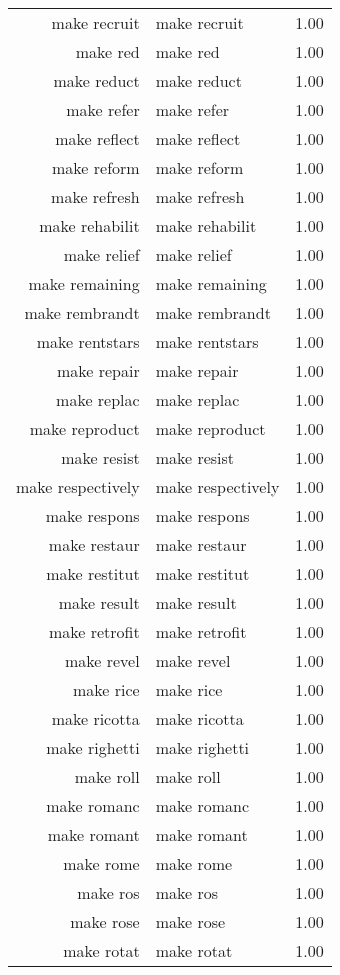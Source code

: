 \begin{table}[ht]
\begin{tabular}{rlr}
  make recruit & make recruit & 1.00 \\ 
  make red & make red & 1.00 \\ 
  make reduct & make reduct & 1.00 \\ 
  make refer & make refer & 1.00 \\ 
  make reflect & make reflect & 1.00 \\ 
  make reform & make reform & 1.00 \\ 
  make refresh & make refresh & 1.00 \\ 
  make rehabilit & make rehabilit & 1.00 \\ 
  make relief & make relief & 1.00 \\ 
  make remaining & make remaining & 1.00 \\ 
  make rembrandt & make rembrandt & 1.00 \\ 
  make rentstars & make rentstars & 1.00 \\ 
  make repair & make repair & 1.00 \\ 
  make replac & make replac & 1.00 \\ 
  make reproduct & make reproduct & 1.00 \\ 
  make resist & make resist & 1.00 \\ 
  make respectively & make respectively & 1.00 \\ 
  make respons & make respons & 1.00 \\ 
  make restaur & make restaur & 1.00 \\ 
  make restitut & make restitut & 1.00 \\ 
  make result & make result & 1.00 \\ 
  make retrofit & make retrofit & 1.00 \\ 
  make revel & make revel & 1.00 \\ 
  make rice & make rice & 1.00 \\ 
  make ricotta & make ricotta & 1.00 \\ 
  make righetti & make righetti & 1.00 \\ 
  make roll & make roll & 1.00 \\ 
  make romanc & make romanc & 1.00 \\ 
  make romant & make romant & 1.00 \\ 
  make rome & make rome & 1.00 \\ 
  make ros & make ros & 1.00 \\ 
  make rose & make rose & 1.00 \\ 
  make rotat & make rotat & 1.00 \\ 

\end{tabular}
\end{table}
